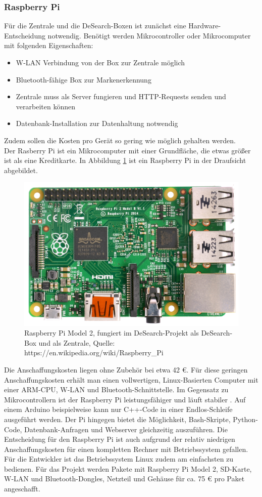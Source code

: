 \subsubsection{Raspberry Pi}\label{sssec:raspberry}
Für die Zentrale und die DeSearch-Boxen ist zunächst eine Hardware-Entscheidung notwendig. Benötigt werden Mikrocontroller oder Mikrocomputer mit folgenden Eigenschaften:
\begin{itemize}
	\item W-LAN Verbindung von der Box zur Zentrale möglich
	\item Bluetooth-fähige Box zur Markenerkennung
	\item Zentrale muss als Server fungieren und HTTP-Requests senden und verarbeiten können
	\item Datenbank-Installation zur Datenhaltung notwendig
\end{itemize}
Zudem sollen die Kosten pro Gerät so gering wie möglich gehalten werden. \\
Der Rasberry Pi ist ein Mikrocomputer mit einer Grundfläche, die etwas größer ist als eine Kreditkarte. In Abbildung \ref{fig:raspi} ist ein Raspberry Pi in der Draufsicht abgebildet.
\begin{figure}
	\centering
	\includegraphics[width=1.0\linewidth]{images/Raspberrypi}
	\caption[Raspberry Pi in der Draufsicht]{Raspberry Pi Model 2, fungiert im DeSearch-Projekt als DeSearch-Box und als Zentrale, Quelle: https://en.wikipedia.org/wiki/Raspberry\_Pi}
	\label{fig:raspi}
\end{figure}
 Die Anschaffungskosten liegen ohne Zubehör bei etwa 42 €. Für diese geringen Anschaffungskosten erhält man einen vollwertigen, Linux-Basierten Computer mit einer ARM-CPU, W-LAN und Bluetooth-Schnittstelle. Im Gegensatz zu Mikrocontrollern ist der Raspberry Pi leistungsfähiger und läuft stabiler \citep[Vgl.][S.35ff.]{raspi}. Auf einem Arduino beispielweise kann nur C++-Code in einer Endlos-Schleife ausgeführt werden. Der Pi hingegen bietet die Möglichkeit, Bash-Skripte, Python-Code, Datenbank-Anfragen und Webserver gleichzeitig auszuführen. Die Entscheidung für den Raspberry Pi ist auch aufgrund der relativ niedrigen Anschaffungskosten für einen kompletten Rechner mit Betriebssystem gefallen. Für die Entwickler ist das Betriebssystem Linux zudem am einfachsten zu bedienen. Für das Projekt werden Pakete mit Raspberry Pi Model 2, SD-Karte, W-LAN und Bluetooth-Dongles, Netzteil und Gehäuse für ca. 75 € pro Paket angeschafft.
